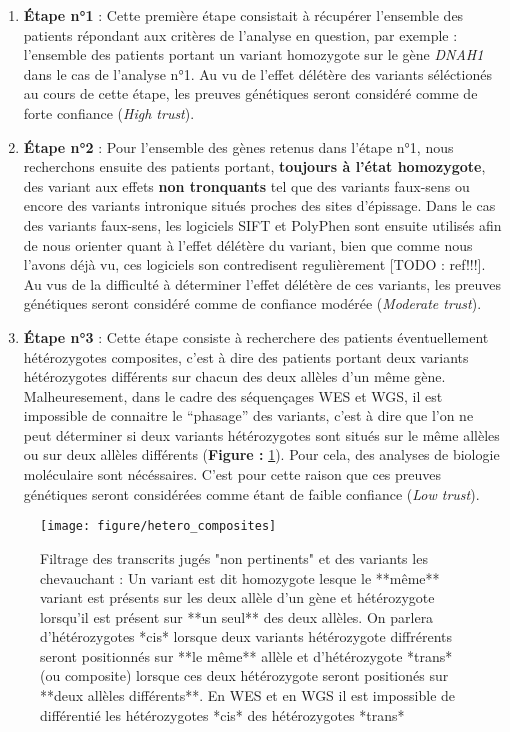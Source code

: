 \documentclass[12pt,twoside]{reedthesis}
\theoremstyle{definition}
\theoremstyle{definition}
\theoremstyle{remark}
\begin{document}
  \begin{enumerate}
  \def\labelenumi{\arabic{enumi}.}
  \item
    \textbf{Étape n°1} : Cette première étape consistait à récupérer
    l'ensemble des patients répondant aux critères de l'analyse en
    question, par exemple : l'ensemble des patients portant un variant
    homozygote sur le gène \emph{DNAH1} dans le cas de l'analyse n°1. Au
    vu de l'effet délétère des variants séléctionés au cours de cette
    étape, les preuves génétiques seront considéré comme de forte
    confiance (\emph{High trust}).
  \item
    \textbf{Étape n°2} : Pour l'ensemble des gènes retenus dans l'étape
    n°1, nous recherchons ensuite des patients portant, \textbf{toujours à
    l'état homozygote}, des variant aux effets \textbf{non tronquants} tel
    que des variants faux-sens ou encore des variants intronique situés
    proches des sites d'épissage. Dans le cas des variants faux-sens, les
    logiciels SIFT et PolyPhen sont ensuite utilisés afin de nous orienter
    quant à l'effet délétère du variant, bien que comme nous l'avons déjà
    vu, ces logiciels son contredisent regulièrement {[}TODO : ref!!!{]}.
    Au vus de la difficulté à déterminer l'effet délétère de ces variants,
    les preuves génétiques seront considéré comme de confiance modérée
    (\emph{Moderate trust}).
  \item
    \textbf{Étape n°3} : Cette étape consiste à recherchere des patients
    éventuellement hétérozygotes composites, c'est à dire des patients
    portant deux variants hétérozygotes différents sur chacun des deux
    allèles d'un même gène. Malheuresement, dans le cadre des séquençages
    WES et WGS, il est impossible de connaitre le ``phasage'' des
    variants, c'est à dire que l'on ne peut déterminer si deux variants
    hétérozygotes sont situés sur le même allèles ou sur deux allèles
    différents (\textbf{Figure : }\ref{fig:compositehet}). Pour cela, des
    analyses de biologie moléculaire sont nécéssaires. C'est pour cette
    raison que ces preuves génétiques seront considérées comme étant de
    faible confiance (\emph{Low trust}).
  \end{enumerate}
  
  \begin{figure}
  
  {\centering \texttt{[image: figure/hetero\_composites]} 
  
  }
  
  \caption[Représentation schématique des ....TODO]{Filtrage des transcrits jugés "non pertinents" et des variants les chevauchant : Un variant est dit homozygote lesque le **même** variant est présents sur les deux allèle d'un gène et hétérozygote lorsqu'il est présent sur **un seul** des deux allèles. On parlera d'hétérozygotes *cis* lorsque deux variants hétérozygote diffrérents seront positionnés sur **le même** allèle et d'hétérozygote *trans* (ou composite) lorsque ces deux hétérozygote seront positionés sur **deux allèles différents**. En WES et en WGS il est impossible de différentié les hétérozygotes *cis* des hétérozygotes *trans*}\label{fig:compositehet}
  \end{figure}
  
\end{document}
